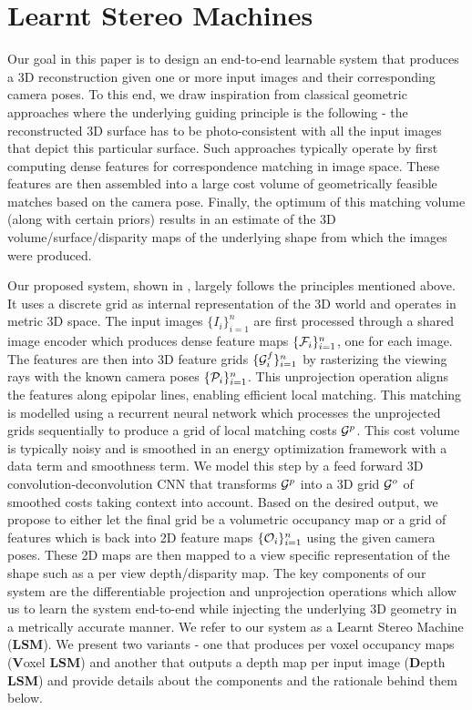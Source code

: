 \documentclass[../thesis.tex]{subfiles}
\begin{document}


\section{Learnt Stereo Machines}
Our goal in this paper is to design an end-to-end learnable system that produces a 3D reconstruction given one or more input images and their corresponding camera poses. To this end, we draw inspiration from classical geometric approaches where the underlying guiding principle is the following - the reconstructed 3D surface has to be photo-consistent with all the input images that depict this particular surface. Such approaches typically operate by first computing dense features for correspondence matching in image space. These features are then assembled into a large cost volume of geometrically feasible matches based on the camera pose. Finally, the optimum of this matching volume (along with certain priors) results in an estimate of the 3D volume/surface/disparity maps of the underlying shape from which the images were produced. 

Our proposed system, shown in , largely follows the principles mentioned above. It uses a discrete grid as internal representation of the 3D world and operates in metric 3D space. The input images $\{I_i\}_{i=1}^n$  are first processed through a shared image encoder which produces dense feature maps $\{\mathcal{F}_i\}_{i=1}^n$, one for each image. The features are then  into 3D feature grids $\{\mathcal{G}^{f}_i\}_{i=1}^n$ by rasterizing the viewing rays with the known camera poses $\{\mathcal{P}_i\}_{i=1}^n$. This unprojection operation aligns the features along epipolar lines, enabling efficient local matching. This matching is modelled using a recurrent neural network which processes the unprojected grids sequentially to produce a grid of local matching costs $\mathcal{G}^p$. This cost volume is typically noisy and is smoothed in an energy optimization framework with a data term and smoothness term. We model this step by a feed forward 3D convolution-deconvolution CNN that transforms $\mathcal{G}^p$ into a 3D grid $\mathcal{G}^o$ of smoothed costs taking context into account. Based on the desired output, we propose to either let the final grid be a volumetric occupancy map or a grid of features which is  back into 2D feature maps $\{\mathcal{O}_i\}_{i=1}^n$ using the given camera poses. These 2D maps are then mapped to a view specific representation of the shape such as a per view depth/disparity map. The key components of our system are the differentiable projection and unprojection operations which allow us to learn the system end-to-end while injecting the underlying 3D geometry in a metrically accurate manner. We refer to our system as a Learnt Stereo Machine (\textbf{LSM}). We present two variants - one that produces per voxel occupancy maps (\textbf{V}oxel \textbf{LSM}) and another that outputs a depth map per input image (\textbf{D}epth \textbf{LSM}) and provide details about the components and the rationale behind them below.
\end{document}
